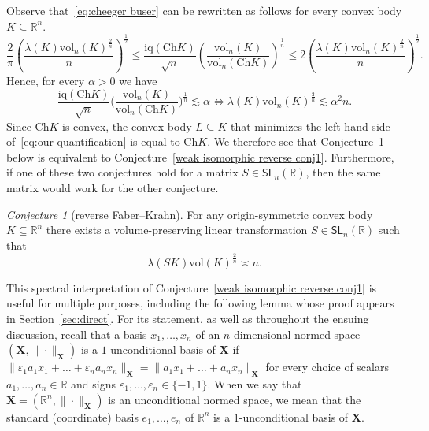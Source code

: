 \documentclass[11pt,reqno]{amsart}
\renewcommand{\le}{\leqslant}
\newcommand{\X}{\mathbf X}
\newcommand{\e}{\varepsilon}
\newcommand{\R}{\mathbb R}
\theoremstyle{remark}
\newtheorem{conjecture}[theorem]{Conjecture}
\newcommand{\iq}{\mathrm{iq}}
\newcommand{\SL}{\mathsf{SL}}
\renewcommand{\subset}{\subseteq}
\newcommand{\Ch}{\mathrm{Ch}}
\newcommand{\vol}{\mathrm{vol}}
\renewcommand{\1}{\mathbf 1}
\begin{document}
Observe that~\eqref{eq:cheeger buser} can be rewritten as follows for every convex body $K\subset \R^n$.
$$
\frac{2}{\pi} \left(\frac{\lambda(K)\vol_n(K)^{\frac{2}{n}}}{n}\right)^{\frac12}\le \frac{\iq(\Ch K)}{\sqrt{n}}\left(\frac{\vol_n(K)}{\vol_n(\Ch K)}\right)^{\frac{1}{n}} \le 2\left(\frac{\lambda(K)\vol_n(K)^{\frac{2}{n}}}{n}\right)^{\frac12}.
$$
Hence, for every $\alpha>0$ we have
\begin{equation}\label{eq:spoectral reverse iso equiv}
\frac{\iq(\Ch K)}{\sqrt{n}}\bigg(\frac{\vol_n( K)}{\vol_n(\Ch K)}\bigg)^{\frac{1}{n}}\lesssim \alpha\iff \lambda(K)\vol_n(K)^{\frac{2}{n}}\lesssim \alpha^2 n.
\end{equation}
Since $\Ch K$ is convex, the convex body $L\subset K$ that minimizes the left hand side of~\eqref{eq:our quantification} is equal to $\Ch K$. We therefore see that Conjecture~\ref{conj:reverse FK}  below is equivalent to Conjecture~\ref{weak isomorphic reverse conj1}. Furthermore, if one of these two conjectures hold for a matrix $S\in \SL_n(\R)$, then the same matrix would work for the other conjecture.


\begin{conjecture}[reverse Faber--Krahn]\label{conj:reverse FK} For any origin-symmetric convex body $K\subset \R^n$ there exists a volume-preserving linear transformation  $S\in \SL_n(\R)$ such that
$$
 \lambda(SK)\vol(K)^{\frac{2}{n}}\asymp n.
$$
\end{conjecture}

This spectral interpretation of Conjecture~\ref{weak isomorphic reverse conj1} is useful  for multiple purposes, including the following lemma whose proof appears in Section~\ref{sec:direct}. For its statement, as well as throughout the ensuing discussion, recall that a basis $x_1,\ldots,x_n$ of an $n$-dimensional normed space $(\X,\|\cdot\|_\X)$ is  a $1$-unconditional basis of $\X$ if $\|\e_1a_1x_1+\ldots +\e_n a_nx_n\|_\X= \|a_1x_1+\ldots +a_nx_n\|_\X$ for every choice of scalars $a_1,\ldots,a_n\in \R$ and signs $\e_1,\ldots,\e_n\in \{-1,1\}$.  When we say that  $\X=(\R^n,\|\cdot\|_\X)$ is an unconditional normed space, we mean that the standard (coordinate) basis $e_1,\ldots,e_n$ of $\R^n$ is a $1$-unconditional basis of $\X$.
\end{document}
